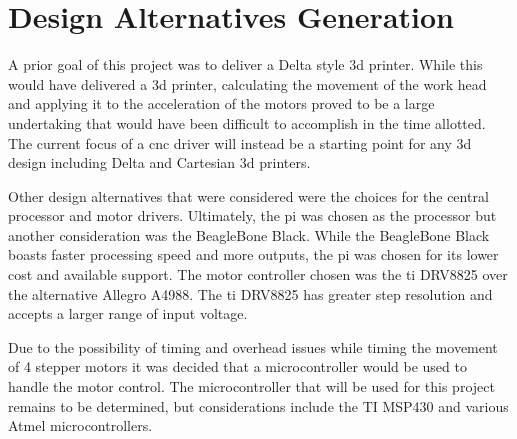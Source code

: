 \chapter{Design Alternatives Generation}
A prior goal of this project was to deliver a Delta style \gls{3d} printer.
While this would have delivered a \gls{3d} printer, calculating the movement of the work head and applying it to the acceleration of the motors proved to be a large undertaking that would have been difficult to accomplish in the time allotted.
The current focus of a \gls{cnc} driver will instead be a starting point for any \gls{3d} design including Delta and Cartesian \gls{3d} printers.

Other design alternatives that were considered were the choices for the central processor and motor drivers.
Ultimately, the \gls{pi} was chosen as the processor but another consideration was the BeagleBone Black.
While the BeagleBone Black boasts faster processing speed and more outputs, the \gls{pi} was chosen for its lower cost and available support.
The motor controller chosen was the \gls{ti} DRV8825 over the alternative Allegro A4988. The \gls{ti} DRV8825 has greater step resolution and accepts a larger range of input voltage.

Due to the possibility of timing and overhead issues while timing the movement of 4 stepper motors it was decided that a microcontroller would be used to handle the motor control.
The microcontroller that will be used for this project remains to be determined, but considerations include the TI MSP430 and various Atmel microcontrollers.